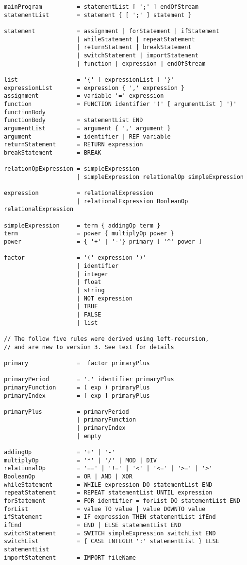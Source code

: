 {\footnotesize
\begin{verbatim}
mainProgram          = statementList [ ';' ] endOfStream
statementList        = statement { [ ';' ] statement }

statement            = assignment | forStatement | ifStatement
                     | whileStatement | repeatStatement
                     | returnStatment | breakStatement
                     | switchStatement | importStatement
                     | function | expression | endOfStream

list                 = '{' [ expressionList ] '}'
expressionList       = expression { ',' expression }
assignment           = variable '=' expression
function             = FUNCTION identifier '(' [ argumentList ] ')' functionBody
functionBody         = statementList END
argumentList         = argument { ',' argument }
argument             = identifier | REF variable
returnStatement      = RETURN expression
breakStatement       = BREAK

relationOpExpression = simpleExpression
                     | simpleExpression relationalOp simpleExpression

expression           = relationalExpression
                     | relationalExpression BooleanOp relationalExpression

simpleExpression     = term { addingOp term }
term                 = power { multiplyOp power }
power                = { '+' | '-'} primary [ '^' power ]

factor               = '(' expression ')'
                     | identifier
                     | integer
                     | float
                     | string
                     | NOT expression
                     | TRUE
                     | FALSE
                     | list

// The follow five rules were derived using left-recursion,
// and are new to version 3. See text for details

primary              =  factor primaryPlus

primaryPeriod        = '.' identifier primaryPlus
primaryFunction      = ( exp ) primaryPlus
primaryIndex         = [ exp ] primaryPlus

primaryPlus          = primaryPeriod
                     | primaryFunction
                     | primaryIndex
                     | empty

addingOp             = '+' | '-'
multiplyOp           = '*' | '/' | MOD | DIV
relationalOp         = '==' | '!=' | '<' | '<=' | '>=' | '>'
BooleanOp            = OR | AND | XOR
whileStatement       = WHILE expression DO statementList END
repeatStatement      = REPEAT statementList UNTIL expression
forStatement         = FOR identifier = forList DO statementList END
forList              = value TO value | value DOWNTO value
ifStatement          = IF expression THEN statementList ifEnd
ifEnd                = END | ELSE statementList END
switchStatement      = SWITCH simpleExpression switchList END
switchList           = { CASE INTEGER ':' statementList } ELSE statementList
importStatement      = IMPORT fileName
\end{verbatim} }



